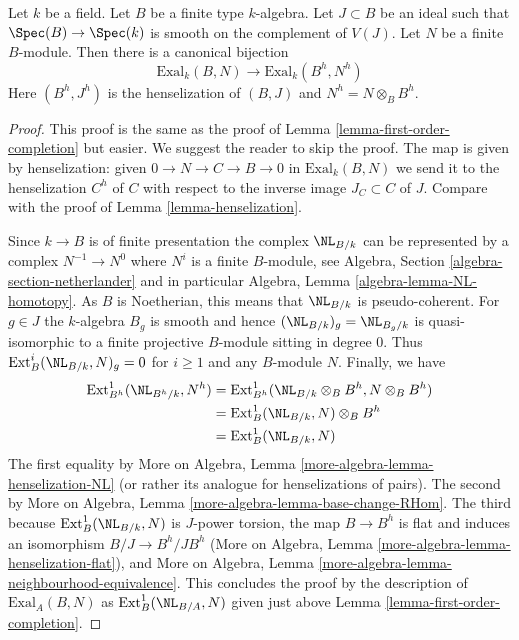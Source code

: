 \begin{lemma}
\label{lemma-first-order-henselization}
Let $k$ be a field. Let $B$ be a finite type $k$-algebra.
Let $J \subset B$ be an ideal such that
$\Spec(B) \to \Spec(k)$ is smooth on the complement of $V(J)$.
Let $N$ be a finite $B$-module.
Then there is a canonical bijection
$$
\text{Exal}_k(B, N) \to \text{Exal}_k(B^h, N^h)
$$
Here $(B^h, J^h)$ is the henselization of $(B, J)$
and $N^h = N \otimes_B B^h$.
\end{lemma}

\begin{proof}
This proof is the same as the proof of
Lemma \ref{lemma-first-order-completion} but easier. We suggest the
reader to skip the proof.
The map is given by henselization: given $0 \to N \to C \to B \to 0$
in $\text{Exal}_k(B, N)$ we send it to the
henselization $C^h$
of $C$ with respect to the inverse image $J_C \subset C$ of $J$.
Compare with the proof of Lemma \ref{lemma-henselization}.

\medskip\noindent
Since $k \to B$ is of finite presentation the complex
$\NL_{B/k}$ can be represented by a complex
$N^{-1} \to N^0$ where $N^i$ is a finite $B$-module, see
Algebra, Section \ref{algebra-section-netherlander} and
in particular
Algebra, Lemma \ref{algebra-lemma-NL-homotopy}.
As $B$ is Noetherian, this means that $\NL_{B/k}$
is pseudo-coherent. For $g \in J$ the $k$-algebra $B_g$
is smooth and hence $(\NL_{B/k})_g = \NL_{B_g/k}$
is quasi-isomorphic to a finite projective $B$-module sitting in degree $0$.
Thus $\text{Ext}^i_B(\NL_{B/k}, N)_g = 0$ for $i \geq 1$
and any $B$-module $N$. Finally, we have
\begin{align*}
\text{Ext}^1_{B^h}(\NL_{B^h/k}, N^h)
& =
\text{Ext}^1_{B^h}(\NL_{B/k} \otimes_B B^h, N \otimes_B B^h) \\
& =
\text{Ext}^1_B(\NL_{B/k}, N) \otimes_B B^h \\
& =
\text{Ext}^1_B(\NL_{B/k}, N)
\end{align*}
The first equality by
More on Algebra, Lemma \ref{more-algebra-lemma-henselization-NL}
(or rather its analogue for henselizations of pairs).
The second by
More on Algebra, Lemma \ref{more-algebra-lemma-base-change-RHom}.
The third because $\text{Ext}^1_B(\NL_{B/k}, N)$ is $J$-power
torsion, the map $B \to B^h$ is flat and induces an isomorphism
$B/J \to B^h/JB^h$ (More on Algebra, Lemma
\ref{more-algebra-lemma-henselization-flat}), and
More on Algebra, Lemma \ref{more-algebra-lemma-neighbourhood-equivalence}.
This concludes the proof by the description of $\text{Exal}_A(B, N)$
as $\text{Ext}^1_B(\NL_{B/A}, N)$ given just above
Lemma \ref{lemma-first-order-completion}.
\end{proof}

